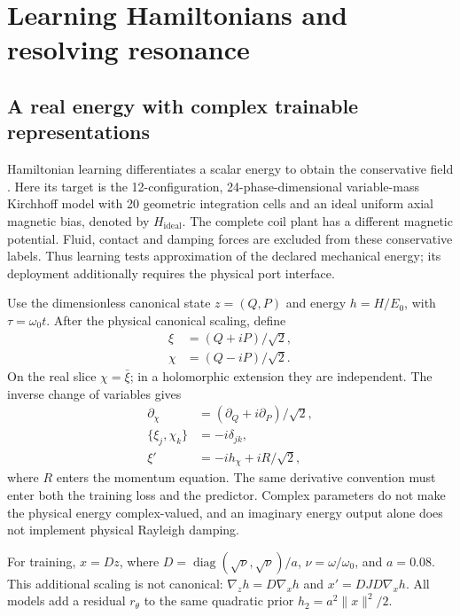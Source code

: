 \section{Learning Hamiltonians and resolving resonance}
\label{sec:learning-kam}

\subsection{A real energy with complex trainable representations}
Hamiltonian learning differentiates a scalar energy to obtain the conservative field \citep{Greydanus2019,Chen2022}. Here its target is the 12-configuration, 24-phase-dimensional variable-mass Kirchhoff model with 20 geometric integration cells and an ideal uniform axial magnetic bias, denoted by $H_{\mathrm{ideal}}$. The complete coil plant has a different magnetic potential. Fluid, contact and damping forces are excluded from these conservative labels. Thus learning tests approximation of the declared mechanical energy; its deployment additionally requires the physical port interface.

Use the dimensionless canonical state $z=(Q,P)$ and energy $h=H/E_0$, with $\tau=\omega_0t$. After the physical canonical scaling, define
\begin{equation}
 \begin{aligned}
 \xi&=(Q+iP)/\sqrt2,\\
 \chi&=(Q-iP)/\sqrt2.
 \end{aligned}
 \label{eq:learn-complex-coordinate}
\end{equation}
On the real slice $\chi=\bar\xi$; in a holomorphic extension they are independent. The inverse change of variables gives
\begin{equation}
 \begin{aligned}
 \partial_\chi&=(\partial_Q+i\partial_P)/\sqrt2,\\
 \{\xi_j,\chi_k\}&=-i\delta_{jk},\\
 \xi'&=-ih_\chi+iR/\sqrt2,
 \end{aligned}
 \label{eq:learn-complex-field}
\end{equation}
where $R$ enters the momentum equation. The same derivative convention must enter both the training loss and the predictor. Complex parameters do not make the physical energy complex-valued, and an imaginary energy output alone does not implement physical Rayleigh damping.

For training, $x=Dz$, where $D=\operatorname{diag}(\sqrt\nu,\sqrt\nu)/a$, $\nu=\omega/\omega_0$, and $a=0.08$. This additional scaling is not canonical: $\nabla_zh=D\nabla_xh$ and $x'=DJD\nabla_xh$. All models add a residual $r_\theta$ to the same quadratic prior $h_2=a^2\|x\|^2/2$.

